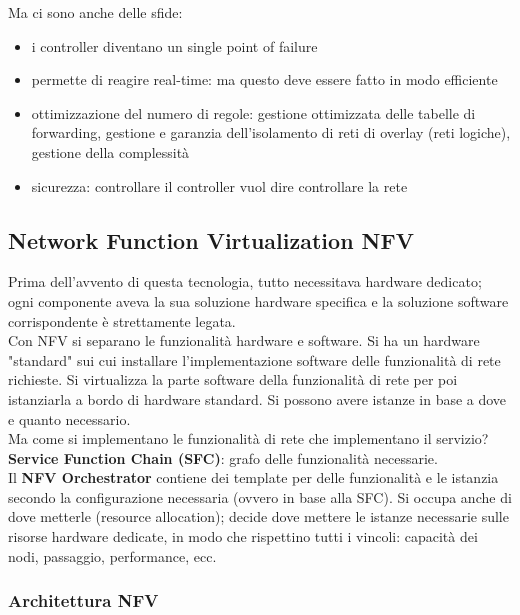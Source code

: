 Ma ci sono anche delle sfide: 
\begin{itemize}
	\item i controller diventano un single point of failure
	\item permette di reagire real-time: ma questo deve essere fatto in modo efficiente
	\item ottimizzazione del numero di regole: gestione ottimizzata delle tabelle di forwarding, gestione e garanzia dell'isolamento di reti di overlay (reti logiche), gestione della complessità
	\item sicurezza: controllare il controller vuol dire controllare la rete
\end{itemize}

\newpage

\subsection{Network Function Virtualization NFV}
Prima dell'avvento di questa tecnologia, tutto necessitava hardware dedicato; ogni componente aveva la sua soluzione hardware specifica e la soluzione software corrispondente è strettamente legata.\\

Con NFV si separano le funzionalità hardware e software. Si ha un hardware "standard" sui cui installare l'implementazione software delle funzionalità di rete richieste. Si virtualizza la parte software della funzionalità di rete per poi istanziarla a bordo di hardware standard. Si possono avere istanze in base a dove e quanto necessario.\\ 

Ma come si implementano le funzionalità di rete che implementano il servizio? \textbf{Service Function Chain (SFC)}: grafo delle funzionalità necessarie. \\
Il \textbf{NFV Orchestrator} contiene dei template per delle funzionalità e le istanzia secondo la configurazione necessaria (ovvero in base alla SFC). Si occupa anche di dove metterle (resource allocation); decide dove mettere le istanze necessarie sulle risorse hardware dedicate, in modo che rispettino tutti i vincoli: capacità dei nodi, passaggio, performance, ecc.\\

\subsubsection{Architettura NFV}

